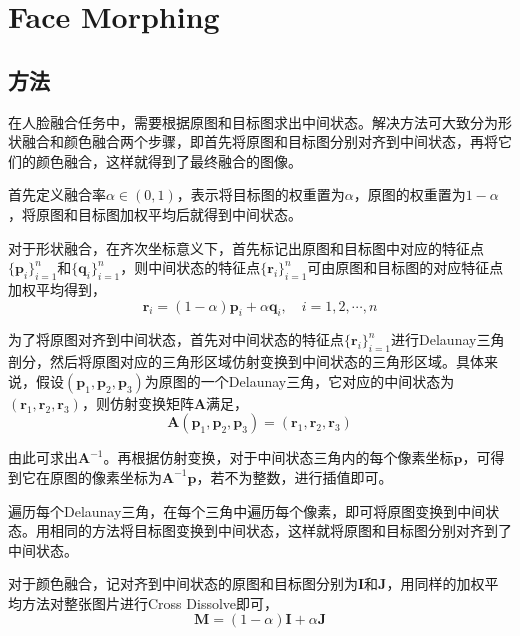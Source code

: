 \documentclass[12pt,a4paper]{article}
\begin{document}
\section{Face Morphing}

\subsection{方法}

在人脸融合任务中，需要根据原图和目标图求出中间状态。解决方法可大致分为形状融合和颜色融合两个步骤，即首先将原图和目标图分别对齐到中间状态，再将它们的颜色融合，这样就得到了最终融合的图像。

首先定义融合率$\alpha \in (0, 1)$，表示将目标图的权重置为$\alpha$，原图的权重置为$1-\alpha$，将原图和目标图加权平均后就得到中间状态。

对于形状融合，在齐次坐标意义下，首先标记出原图和目标图中对应的特征点$\{\mathbf{p}_i\}_{i=1}^n$和$\{\mathbf{q}_i\}_{i=1}^n$，则中间状态的特征点$\{\mathbf{r}_i\}_{i=1}^n$可由原图和目标图的对应特征点加权平均得到，
\begin{equation}
    \mathbf{r}_i = (1 - \alpha) \mathbf{p}_i + \alpha \mathbf{q}_i, \quad i = 1,2,\cdots,n
\end{equation}

为了将原图对齐到中间状态，首先对中间状态的特征点$\{\mathbf{r}_i\}_{i=1}^n$进行Delaunay三角剖分，然后将原图对应的三角形区域仿射变换到中间状态的三角形区域。具体来说，假设$(\mathbf{p}_1, \mathbf{p}_2,\mathbf{p}_3)$为原图的一个Delaunay三角，它对应的中间状态为$(\mathbf{r}_1, \mathbf{r}_2,\mathbf{r}_3)$，则仿射变换矩阵$\mathbf{A}$满足，
\begin{equation}
    \mathbf{A} (\mathbf{p}_1, \mathbf{p}_2, \mathbf{p}_3) = (\mathbf{r}_1, \mathbf{r}_2,\mathbf{r}_3)
\end{equation}

由此可求出$\mathbf{A}^{-1}$。再根据仿射变换，对于中间状态三角内的每个像素坐标$\mathbf{p}$，可得到它在原图的像素坐标为$\mathbf{A}^{-1} \mathbf{p}$，若不为整数，进行插值即可。

遍历每个Delaunay三角，在每个三角中遍历每个像素，即可将原图变换到中间状态。用相同的方法将目标图变换到中间状态，这样就将原图和目标图分别对齐到了中间状态。

对于颜色融合，记对齐到中间状态的原图和目标图分别为$\mathbf{I}$和$\mathbf{J}$，用同样的加权平均方法对整张图片进行Cross Dissolve即可，
\begin{equation}
    \mathbf{M} = (1-\alpha)\mathbf{I} + \alpha \mathbf{J}
\end{equation}
\end{document}
